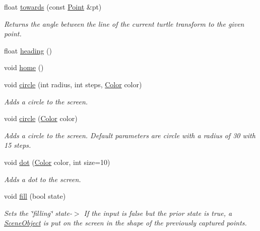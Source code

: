 \begin{DoxyCompactItemize}
float \hyperlink{classcturtle_1_1Turtle_ab625cf304b44417c7d3cacd65b372d37}{towards} (const \hyperlink{structcturtle_1_1ivec2}{Point} \&pt)
\begin{DoxyCompactList}\small\item\em Returns the angle between the line of the current turtle transform to the given point. \end{DoxyCompactList}\item 
float \hyperlink{classcturtle_1_1Turtle_a5c90aa6dea03e88f202dcadc4ff77354}{heading} ()
\item 
void \hyperlink{classcturtle_1_1Turtle_ab6558ff8b547bfb54a68c55259f7bb32}{home} ()
\item 
void \hyperlink{classcturtle_1_1Turtle_a6ce4e8065581887d006f420d0e93967e}{circle} (int radius, int steps, \hyperlink{classcturtle_1_1Color}{Color} color)
\begin{DoxyCompactList}\small\item\em Adds a circle to the screen. \end{DoxyCompactList}\item 
void \hyperlink{classcturtle_1_1Turtle_a1f945648941a632ed33d28e9c51b8207}{circle} (\hyperlink{classcturtle_1_1Color}{Color} color)
\begin{DoxyCompactList}\small\item\em Adds a circle to the screen. Default parameters are circle with a radius of 30 with 15 steps. \end{DoxyCompactList}\item 
void \hyperlink{classcturtle_1_1Turtle_af33a02ec769c35671204abcc33050b0f}{dot} (\hyperlink{classcturtle_1_1Color}{Color} color, int size=10)
\begin{DoxyCompactList}\small\item\em Adds a dot to the screen. \end{DoxyCompactList}\item 
void \hyperlink{classcturtle_1_1Turtle_a7026fc9ad563b91b5a7a168718e91d6f}{fill} (bool state)
\begin{DoxyCompactList}\small\item\em Sets the \char`\"{}filling\char`\"{} state-\/$>$ If the input is false but the prior state is true, a \hyperlink{structcturtle_1_1SceneObject}{Scene\+Object} is put on the screen in the shape of the previously captured points. \end{DoxyCompactList}\item 
\mbox{\label{classcturtle_1_1Turtle_ac28e8f1d1fbf19abffb5e92b98e3c602}} 

\end{DoxyCompactItemize}

